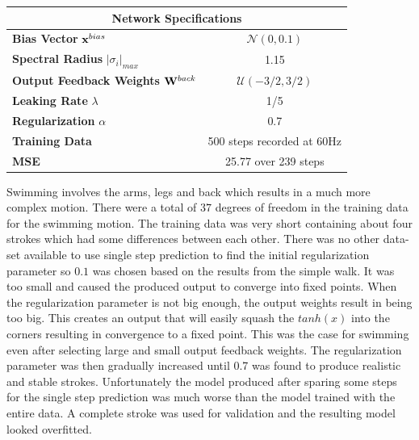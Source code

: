 \documentclass[letterpaper,9pt]{article}
\newcommand{\networkSpecs}[7]{
  \begin{center}
  \begin{tabular}{ | l | c | }
    \hline
    \multicolumn{2}{|c|}{{\bf Network Specifications}} \\
    \hline
    {\bf Bias Vector} ${\bf x}^{bias}$ & $\mathcal{N}(#1)$ \\
    \hline
    {\bf Spectral Radius} $|\sigma_i|_{max}$ & #2 \\
    \hline
    {\bf Output Feedback Weights} ${\bf W}^{back}$ & $\mathcal{U}(#3)$ \\
    \hline
    {\bf Leaking Rate} $\lambda$ & #4 \\
    \hline
    {\bf Regularization} $\alpha$ & #5\\
    \hline
    {\bf Training Data} & #6\\
    \hline
    {\bf MSE} & #7\\
    \hline
  \end{tabular}    
  \end{center}
}
\begin{document}
\networkSpecs{0,0.1}
             {1.15}
             {-3/2,3/2}
             {1/5}
             {0.7}
             {500 steps recorded at 60Hz}
             {25.77 over 239 steps}


Swimming involves the arms, legs and back which results in a much more complex motion. There were a total of $37$ degrees of freedom in the training data for the swimming motion. The training data was very short containing about four strokes which had some differences between each other. There was no other data-set available to use single step prediction to find the initial regularization parameter so $0.1$ was chosen based on the results from the simple walk. It was too small and caused the produced output to converge into fixed points. When the regularization parameter is not big enough, the output weights result in being too big. This creates an output that will easily squash the $tanh(x)$ into the corners resulting in convergence to a fixed point. This was the case for swimming even after selecting large and small output feedback weights. The regularization parameter was then gradually increased until 0.7 was found to produce realistic and stable strokes. Unfortunately the model produced after sparing some steps for the single step prediction was much worse than the model trained with the entire data. A complete stroke was used for validation and the resulting model looked overfitted. \pagebreak
\end{document}
